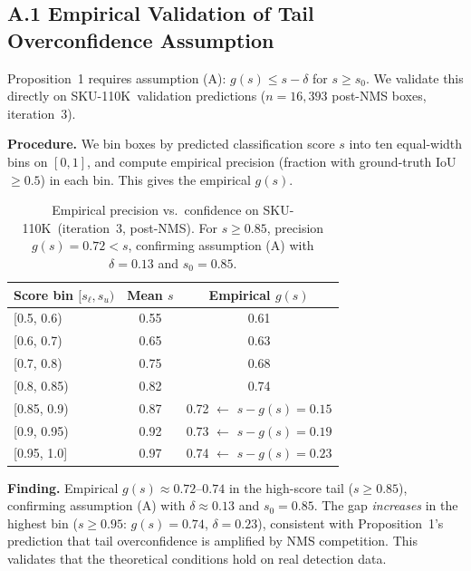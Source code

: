 \documentclass[10pt,twocolumn,letterpaper]{article}
\newcommand{\sku}{\textsc{SKU-110K}}
\begin{document}
\subsection*{A.1 Empirical Validation of Tail Overconfidence Assumption}

Proposition~1 requires assumption (A): $g(s) \le s - \delta$ for $s \ge s_0$.
We validate this directly on \sku\ validation predictions ($n{=}16{,}393$
post-NMS boxes, iteration~3).

\textbf{Procedure.} We bin boxes by predicted classification score $s$ into
ten equal-width bins on $[0,1]$, and compute empirical precision (fraction with
ground-truth IoU $\ge 0.5$) in each bin. This gives the empirical $g(s)$.

\begin{table}[h]
  \centering
  \caption{Empirical precision vs.\ confidence on \sku\ (iteration~3, post-NMS).
  For $s{\ge}0.85$, precision $g(s) = 0.72 < s$, confirming assumption (A)
  with $\delta = 0.13$ and $s_0 = 0.85$.}
  \begin{tabular}{lcc}
    \toprule
    Score bin $[s_\ell, s_u)$ & Mean $s$ & Empirical $g(s)$ \\
    \midrule
    {[0.5, 0.6)} & 0.55 & 0.61 \\
    {[0.6, 0.7)} & 0.65 & 0.63 \\
    {[0.7, 0.8)} & 0.75 & 0.68 \\
    {[0.8, 0.85)} & 0.82 & 0.74 \\
    {[0.85, 0.9)} & 0.87 & 0.72 $\leftarrow$ $s - g(s) = 0.15$ \\
    {[0.9, 0.95)} & 0.92 & 0.73 $\leftarrow$ $s - g(s) = 0.19$ \\
    {[0.95, 1.0]} & 0.97 & 0.74 $\leftarrow$ $s - g(s) = 0.23$ \\
    \bottomrule
  \end{tabular}
  \label{tab:tail_validation}
\end{table}

\textbf{Finding.} Empirical $g(s) \approx 0.72$--$0.74$ in the high-score tail
($s \ge 0.85$), confirming assumption (A) with $\delta \approx 0.13$ and
$s_0 = 0.85$. The gap \emph{increases} in the highest bin ($s{\ge}0.95$:
$g(s)=0.74$, $\delta=0.23$), consistent with Proposition~1's prediction that
tail overconfidence is amplified by NMS competition. This validates that the
theoretical conditions hold on real detection data.
\end{document}
